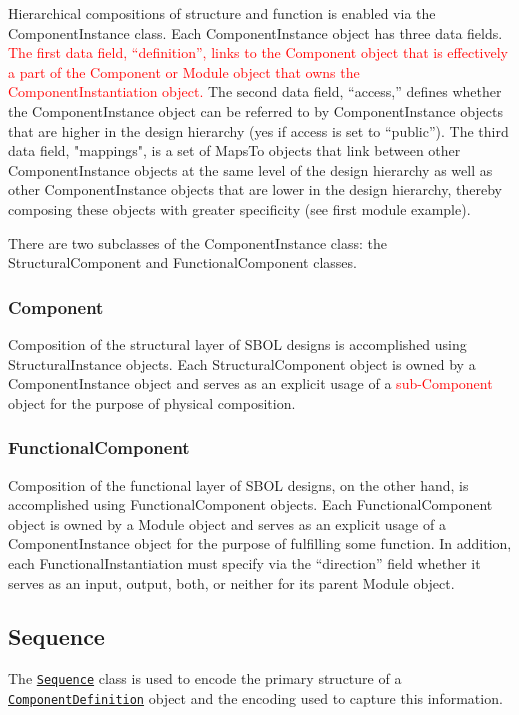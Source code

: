 \documentclass[draftspec]{sbmlpkgspec}
\newcommand{\sbol}[1]{\texttt{\hyperref[sec:#1]{#1}}}
\begin{document}
Hierarchical compositions of structure and function is enabled via the ComponentInstance class. Each ComponentInstance object has three data fields. \textcolor{red}{The first data field, “definition”, links to the Component object that is effectively a part of the Component or Module object that owns the ComponentInstantiation object.} The second data field, “access,” defines whether the ComponentInstance object can be referred to by ComponentInstance objects that are higher in the design hierarchy (yes if access is set to “public”). The third data field, "mappings", is a set of MapsTo objects that link between other ComponentInstance objects at the same level of the design hierarchy as well as other ComponentInstance objects that are lower in the design hierarchy, thereby composing these objects with greater specificity (see first module example).

There are two subclasses of the ComponentInstance class: the StructuralComponent and FunctionalComponent classes.




\subsubsection{Component}
\label{sec:Component}
Composition of the structural layer of SBOL designs is accomplished using StructuralInstance objects. Each StructuralComponent object is owned by a ComponentInstance object and serves as an explicit usage of a \textcolor{red}{sub-Component} object for the purpose of physical composition.




\subsubsection{FunctionalComponent}
\label{sec:FunctionalComponent}
Composition of the functional layer of SBOL designs, on the other hand, is accomplished using FunctionalComponent objects. Each FunctionalComponent object is owned by a Module object and serves as an explicit usage of a ComponentInstance object for the purpose of fulfilling some function. In addition, each FunctionalInstantiation must specify via the “direction” field whether it serves as an  input, output, both, or neither for its parent Module object. 




\subsection{Sequence}
\label{sec:Sequence}
The \sbol{Sequence} class is used to encode the primary structure of a \sbol{ComponentDefinition} object and the encoding used to capture this information.
\end{document}
